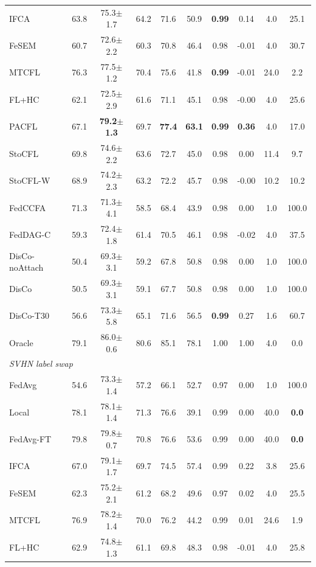 \begin{tabular}{lccccccccc}
IFCA & 63.8 & 75.3$\pm$1.7 & 64.2 & 71.6 & 50.9 & \textbf{0.99} & 0.14 & 4.0 & 25.1 \\
FeSEM & 60.7 & 72.6$\pm$2.2 & 60.3 & 70.8 & 46.4 & 0.98 & -0.01 & 4.0 & 30.7 \\
MTCFL & 76.3 & 77.5$\pm$1.2 & 70.4 & 75.6 & 41.8 & \textbf{0.99} & -0.01 & 24.0 & 2.2 \\
FL+HC & 62.1 & 72.5$\pm$2.9 & 61.6 & 71.1 & 45.1 & 0.98 & -0.00 & 4.0 & 25.6 \\
PACFL & 67.1 & \textbf{79.2$\pm$1.3} & 69.7 & \textbf{77.4} & \textbf{63.1} & \textbf{0.99} & \textbf{0.36} & 4.0 & 17.0 \\
StoCFL & 69.8 & 74.6$\pm$2.2 & 63.6 & 72.7 & 45.0 & 0.98 & 0.00 & 11.4 & 9.7 \\
StoCFL-W & 68.9 & 74.2$\pm$2.3 & 63.2 & 72.2 & 45.7 & 0.98 & -0.00 & 10.2 & 10.2 \\
FedCCFA & 71.3 & 71.3$\pm$4.1 & 58.5 & 68.4 & 43.9 & 0.98 & 0.00 & 1.0 & 100.0 \\
FedDAG-C & 59.3 & 72.4$\pm$1.8 & 61.4 & 70.5 & 46.1 & 0.98 & -0.02 & 4.0 & 37.5 \\
DisCo-noAttach & 50.4 & 69.3$\pm$3.1 & 59.2 & 67.8 & 50.8 & 0.98 & 0.00 & 1.0 & 100.0 \\
DisCo & 50.5 & 69.3$\pm$3.1 & 59.1 & 67.7 & 50.8 & 0.98 & 0.00 & 1.0 & 100.0 \\
DisCo-T30 & 56.6 & 73.3$\pm$5.8 & 65.1 & 71.6 & 56.5 & \textbf{0.99} & 0.27 & 1.6 & 60.7 \\
Oracle & 79.1 & 86.0$\pm$0.6 & 80.6 & 85.1 & 78.1 & 1.00 & 1.00 & 4.0 & 0.0 \\
\midrule
\multicolumn{10}{l}{\textit{SVHN label swap}}\\
FedAvg & 54.6 & 73.3$\pm$1.4 & 57.2 & 66.1 & 52.7 & 0.97 & 0.00 & 1.0 & 100.0 \\
Local & 78.1 & 78.1$\pm$1.4 & 71.3 & 76.6 & 39.1 & 0.99 & 0.00 & 40.0 & \textbf{0.0} \\
FedAvg-FT & 79.8 & 79.8$\pm$0.7 & 70.8 & 76.6 & 53.6 & 0.99 & 0.00 & 40.0 & \textbf{0.0} \\
IFCA & 67.0 & 79.1$\pm$1.7 & 69.7 & 74.5 & 57.4 & 0.99 & 0.22 & 3.8 & 25.6 \\
FeSEM & 62.3 & 75.2$\pm$2.1 & 61.2 & 68.2 & 49.6 & 0.97 & 0.02 & 4.0 & 25.5 \\
MTCFL & 76.9 & 78.2$\pm$1.4 & 70.0 & 76.2 & 44.2 & 0.99 & 0.01 & 24.6 & 1.9 \\
FL+HC & 62.9 & 74.8$\pm$1.3 & 61.1 & 69.8 & 48.3 & 0.98 & -0.01 & 4.0 & 25.8 \\

\end{tabular}
